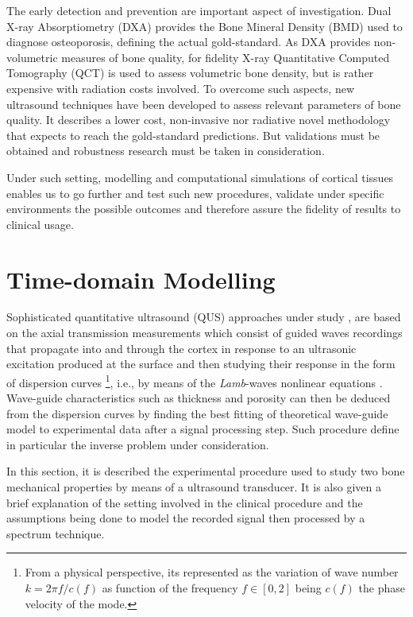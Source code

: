 The early detection and prevention are important aspect of investigation. Dual X-ray Absorptiometry (DXA) provides the Bone Mineral Density (BMD) used to diagnose osteoporosis, defining the actual gold-standard.
As DXA provides non-volumetric measures of bone quality, for fidelity X-ray Quantitative Computed Tomography (QCT) is used to assess volumetric bone density, but is rather expensive with radiation costs involved. To overcome such aspects, new ultrasound techniques have been developed to assess relevant parameters of bone quality. It describes a lower cost, non-invasive nor radiative novel methodology that expects to reach the gold-standard predictions. But validations must be obtained and robustness research must be taken in consideration.

Under such setting, modelling and computational simulations of cortical tissues enables us to go further and test such new  procedures, validate under specific environments the possible outcomes and therefore assure the fidelity of results to clinical usage.


\section{Time-domain Modelling}

Sophisticated quantitative ultrasound (QUS) approaches under study \cite{Foiret2014} \cite{Minonzio2018}, are based on the axial transmission measurements which consist of guided waves recordings that propagate into and through the cortex in response to an ultrasonic excitation produced at the surface and then studying their response in the form of dispersion curves \footnote{From a physical perspective, its represented as the variation of wave number $k = 2 \pi f/c(f)$ as function of the frequency $f \in [0, 2]$ being $c(f)$ the phase velocity of the mode.}, i.e., by means of the \textit{Lamb}-waves nonlinear equations \cite{Rhee2007}.
Wave-guide characteristics such as thickness and porosity can then be deduced from the dispersion curves by finding the best fitting of theoretical wave-guide model to experimental data after a signal processing step. Such procedure define in particular the inverse problem under consideration.

In this section, it is described the experimental procedure used to study two bone mechanical properties by means of a ultrasound transducer.
It is also given a brief explanation of the setting involved in the clinical procedure and the assumptions being done to model the recorded signal then processed by a spectrum technique. 

